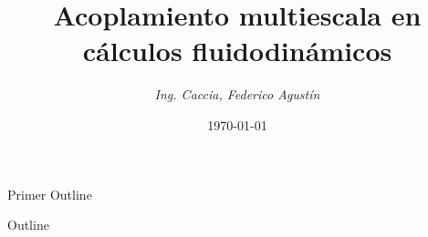 \documentclass{beamer}
\author{\textit{Ing. Caccia, Federico Agustín}}
\title{Acoplamiento multiescala en cálculos fluidodinámicos}
\date{\today}
\begin{document}
\begin{frame}[plain]
  \titlepage
\end{frame}

Primer Outline
\begin{frame}{Outline}
  \small
\end{frame}







\end{document}

